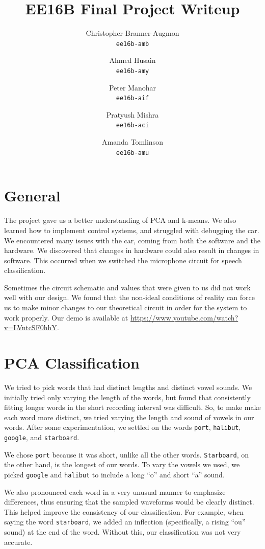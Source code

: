 \documentclass{article}
\title{\vspace{-2cm}\textsc{EE16B} Final Project Writeup}
\author{%
        Christopher Branner-Augmon \\
          \texttt{ee16b-amb}
        \and
        Ahmed Husain \\
          \texttt{ee16b-amy}
        \and
        Peter Manohar \\
          \texttt{ee16b-aif}
        \and
        Pratyush Mishra \\
        \texttt{ee16b-aci}
        \and
        Amanda Tomlinson\\
        \texttt{ee16b-amu}
      }
\newcommand{\port}{\texttt{port}}
\newcommand{\google}{\texttt{google}}
\newcommand{\starboard}{\texttt{starboard}}
\newcommand{\halibut}{\texttt{halibut}}
\begin{document}
\maketitle
\section*{General}

The project gave us a better understanding of PCA and k-means. We also learned
how to implement control systems, and struggled with debugging the car.  We
encountered many issues with the car, coming from both the software and the
hardware. We discovered that changes in hardware could also result in changes
in software. This occurred when we switched the microphone circuit for speech
classification.

Sometimes the circuit schematic and values that were given to us did not work
well with our design. We found that the non-ideal conditions of reality can
force us to make minor changes to our theoretical circuit in order for the
system to work properly.  Our demo is available at
\url{https://www.youtube.com/watch?v=LVntcSF0hhY}.

\section*{PCA Classification}

We tried to pick words that had distinct lengths and distinct vowel sounds. We
initially tried only varying the length of the words, but found that
consistently fitting longer words in the short recording interval was
difficult.  So, to make make each word more distinct, we tried varying the
length and sound of vowels in our words. After some experimentation, we settled
on the words {\port}, {\halibut}, {\google}, and {\starboard}.

We chose {\port} because it was short, unlike all the other words.
\texttt{Starboard}, on the other hand, is the longest of our words. To vary the
vowels we used, we picked {\google} and {\halibut} to include a long ``o''
and short ``a'' sound.

We also pronounced each word in a very unusual manner to emphasize differences,
thus ensuring that the sampled waveforms would be clearly distinct.  This
helped improve the consistency of our classification. For example, when saying
the word \texttt{starboard}, we added an inflection (specifically, a rising ``ou''
sound) at the end of the word. Without this, our classification was not very
accurate.
\end{document}
